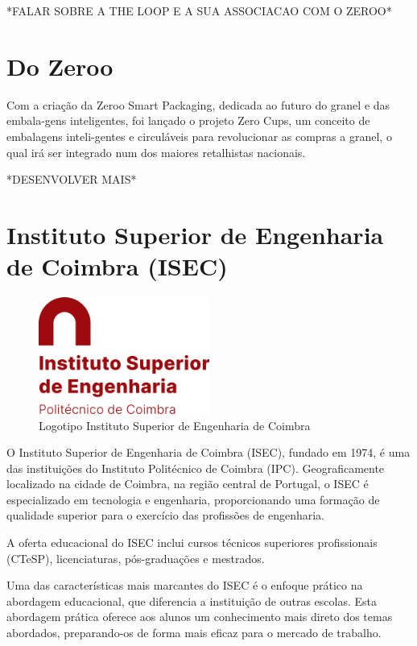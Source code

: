 *FALAR SOBRE A THE LOOP E A SUA ASSOCIACAO COM O ZEROO*

\section{Do Zeroo}

Com a criação da Zeroo Smart Packaging, dedicada ao futuro do granel e das embala-gens inteligentes, foi lançado o projeto Zero Cups, um conceito de embalagens inteli-gentes e circuláveis para revolucionar as compras a granel, o qual irá ser integrado num dos maiores retalhistas nacionais.

*DESENVOLVER MAIS*

\section{Instituto Superior de Engenharia de Coimbra (ISEC)}
\begin{figure}[h]
    \centering
    \includegraphics[width=0.5\textwidth]{Imagens/isec_logotipo.png} %
    \caption{Logotipo Instituto Superior de Engenharia de Coimbra}
    \label{fig:logotipo_isec}
\end{figure}

O Instituto Superior de Engenharia de Coimbra (ISEC), fundado em 1974, é uma das instituições do Instituto Politécnico de Coimbra (IPC). Geograficamente localizado na cidade de Coimbra, na região central de Portugal, o ISEC é especializado em tecnologia e engenharia, proporcionando uma formação de qualidade superior para o exercício das profissões de engenharia.

A oferta educacional do ISEC inclui cursos técnicos superiores profissionais (CTeSP), licenciaturas, pós-graduações e mestrados.

Uma das características mais marcantes do ISEC é o enfoque prático na abordagem educacional, que diferencia a instituição de outras escolas. Esta abordagem prática oferece aos alunos um conhecimento mais direto dos temas abordados, preparando-os de forma mais eficaz para o mercado de trabalho.

